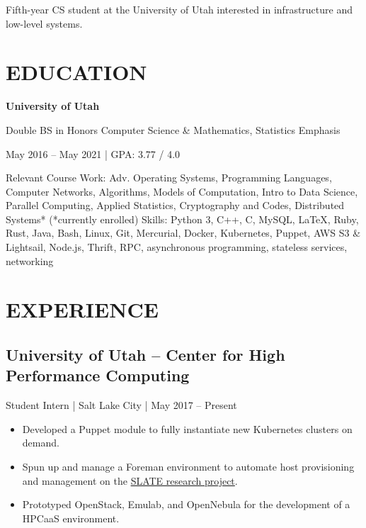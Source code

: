 \documentclass[10pt, letterpaper]{resume}
\begin{document}
\maketitle

{\centering
 Fifth-year CS student at the University of Utah interested in infrastructure and low-level systems.
 \par
}

\section{EDUCATION}
 {\centering
  \textbf{University of Utah}

  Double BS in Honors Computer Science \& Mathematics, Statistics Emphasis

  May 2016 -- May 2021 | GPA: 3.77 / 4.0
  \par
 }
\vspace{10pt}
{{\selectfont Relevant Course Work:}
Adv. Operating Systems, Programming Languages, Computer Networks, Algorithms, Models of Computation, Intro to Data Science, Parallel Computing, Applied Statistics, Cryptography and Codes, Distributed Systems* {\footnotesize(*currently enrolled)}}
\smallbreak%
{{\selectfont Skills:} Python 3, C++, C, MySQL, \LaTeX, Ruby, Rust, Java, Bash, Linux, Git, Mercurial, Docker, Kubernetes, Puppet, AWS S3 \& Lightsail, Node.js, Thrift, RPC, asynchronous programming, stateless services, networking}

\section{EXPERIENCE}
\subsection{University of Utah -- Center for High Performance Computing}
Student Intern | Salt Lake City | May 2017 -- Present
\begin{itemize}
 \item Developed a Puppet module to fully instantiate new Kubernetes clusters on demand.
 \item Spun up and manage a Foreman environment to automate host provisioning and management on the \href{https://slateci.io}{SLATE research project}.
 \item Prototyped OpenStack, Emulab, and OpenNebula for the development of a HPCaaS environment.
\end{itemize}
\end{document}
